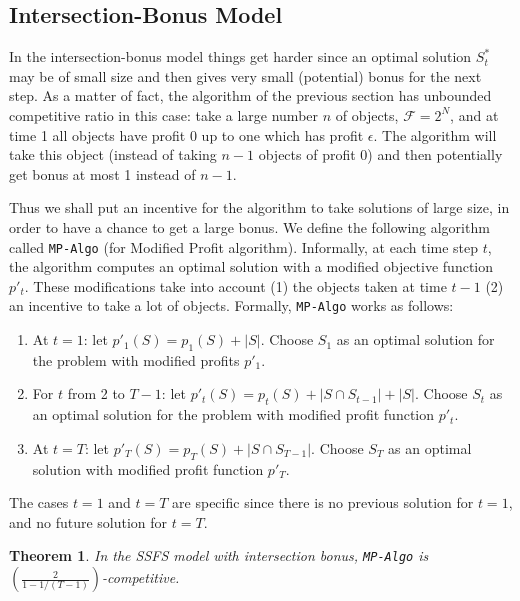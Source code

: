 \documentclass[a4paper]{book}
\newtheorem{theorem}{Theorem}[chapter]
\newcommand\hard{Intersection}
\begin{document}
\subsection{\hard{}-Bonus Model}
\label{subsec:static-intersection}

In the intersection-bonus model things get harder since an optimal solution $S^*_t$ may be of small size and then gives very small (potential) bonus for the next step. As a matter of fact, the algorithm of the previous section has unbounded competitive ratio in this case: take a large number $n$ of objects, $\mathcal{F}=2^N$, and at time 1 all objects have profit 0 up to one which has profit $\epsilon$. The algorithm will take this object (instead of taking $n-1$ objects of profit 0) and then potentially get bonus at most 1 instead of $n-1$.

Thus we shall put an incentive for the algorithm to take solutions of large size, in order to have a chance to get a large bonus. We define the following algorithm called \texttt{MP-Algo} (for Modified Profit algorithm). Informally, at each time step $t$, the algorithm computes an optimal solution with a modified objective function $p'_{t}$. These modifications take into account (1) the objects taken at time $t-1$ (2) an incentive to take a lot of objects. Formally, \texttt{MP-Algo} works as follows:

\begin{enumerate}
    \item At $t=1$: let $p'_{1}(S)=p_{1}(S)+|S|$. Choose $S_1$ as an optimal solution for the problem with modified profits $p'_{1}$. 
    \item For $t$ from 2 to $T-1$: let $p'_{t}(S)=p_{t}(S)+|S\cap S_{t-1}|+|S|$. Choose $S_t$ as an optimal solution for the problem  with modified profit function $p'_{t}$. 
    \item At $t=T$: let $p'_{T}(S)=p_{T}(S)+|S\cap S_{T-1}|$. Choose $S_T$ as an optimal solution with modified profit function $p'_{T}$. 
\end{enumerate}
The cases $t=1$ and $t=T$ are specific since there is no previous solution for $t=1$, and no future solution for $t=T$.

\begin{theorem}\label{thm:static-intersection-upper}
In the SSFS model with intersection bonus, \texttt{MP-Algo} is $\left(\frac{2}{1-1/(T-1)}\right)$-compe\-titive.
\end{theorem}
\end{document}
